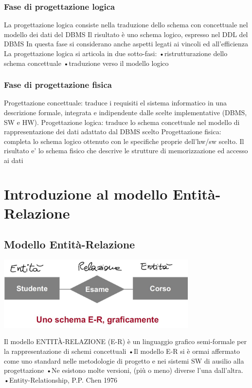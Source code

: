 \subsection{Fase di progettazione logica}
La progettazione logica consiste nella traduzione dello
schema con concettuale nel modello dei dati del DBMS
Il risultato è uno schema logico, espresso nel DDL
del DBMS
In questa fase si considerano anche aspetti legati ai vincoli
ed all'efficienza
La progettazione logica si articola in due sotto-fasi:
•ristrutturazione dello schema concettuale
•traduzione verso il modello logico

\subsection{Fase di progettazione fisica}
Progettazione concettuale: traduce i
requisiti el sistema informatico in una descrizione
formale, integrata e indipendente dalle scelte
implementative (DBMS, SW e HW).
Progettazione logica: traduce lo schema
concettuale nel modello di rappresentazione
dei dati adattato dal DBMS scelto
Progettazione fisica: completa lo schema
logico ottenuto con le specifiche proprie
dell'hw/sw scelto. Il risultato e' lo schema
fisico che descrive le strutture di
memorizzazione ed accesso ai dati

\chapter{Introduzione al modello Entità-Relazione}
\section{Modello Entità-Relazione}
\begin{center}
    \includegraphics[width=0.75\textwidth]{chaptersLezioniSara/img/ER1.jpg}
\end{center}
Il modello ENTITÀ-RELAZIONE (E-R) è un
linguaggio grafico semi-formale per la
rappresentazione di schemi concettuali
•Il modello E-R si è ormai affermato come uno
standard nelle metodologie di progetto e nei sistemi
SW di ausilio alla progettazione
•Ne esistono molte versioni, (più o meno) diverse
l'una dall'altra.
•Entity-Relationship, P.P. Chen 1976

